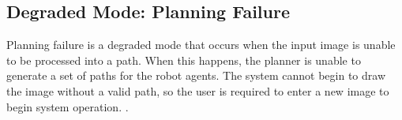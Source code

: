 \subsection{Degraded Mode: Planning Failure}
Planning failure is a degraded mode that occurs when the input image is unable to be processed into a path. When this happens, the planner is unable to generate a set of paths for the robot agents. The system cannot begin to draw the image without a valid path, so the user is required to enter a new image to begin system operation.  .
